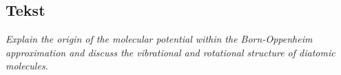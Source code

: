 \subsection{Tekst}

\emph{Explain the origin of the molecular potential within the Born-Oppenheim approximation and discuss the vibrational and rotational structure of diatomic molecules.}